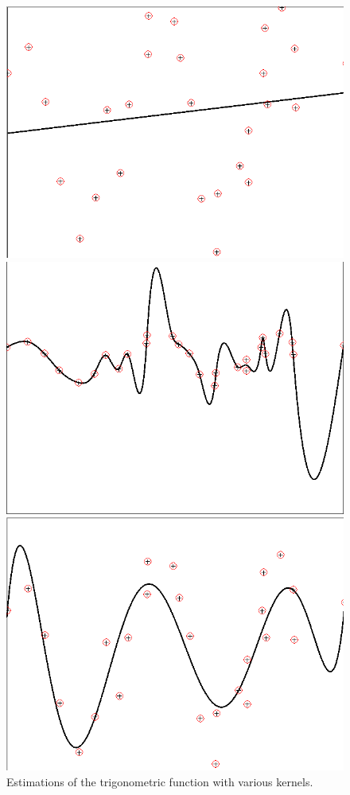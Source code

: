\documentclass[•]{article}
\begin{document}
\begin{figure}[H]
\centering
\begin{minipage}{.3\textwidth}
\includegraphics[width=.8\textwidth]{estlin.png}
\end{minipage}
\begin{minipage}{.3\textwidth}
\includegraphics[width=.8\textwidth]{estlinspline.png}
\end{minipage}
\begin{minipage}{.3\textwidth}
\includegraphics[width=.8\textwidth]{estrbf.png}
\end{minipage}
\caption{Estimations of the trigonometric function with various kernels.}
\end{figure}
\end{document}

